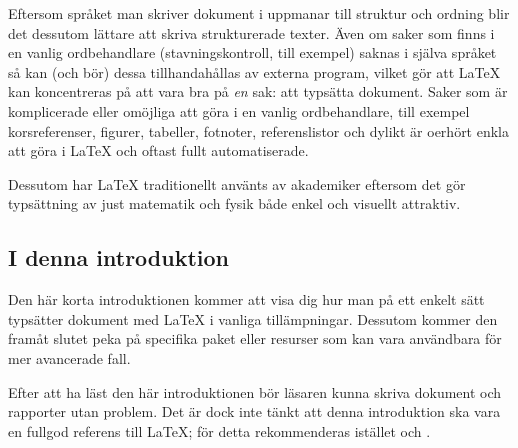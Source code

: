 \documentclass[draft,swe,10pt,nofont]{skrapport}
\makeatletter
\let\@oldLaTeX\LaTeX
\def\LaTeX{\texorpdfstring{\@oldLaTeX}{LaTeX}}
\makeatother
\begin{document}
	Eftersom språket man skriver dokument i uppmanar till struktur och ordning
	blir det dessutom lättare att skriva strukturerade texter. Även om saker
	som finns i en vanlig ordbehandlare (stavningskontroll, till exempel) saknas i
	själva språket så kan (och bör) dessa tillhandahållas av externa program,
	vilket gör att \LaTeX{} kan koncentreras på att vara bra på \emph{en} sak:
	att typsätta dokument. Saker som är komplicerade eller omöjliga att göra
	i en vanlig ordbehandlare, till exempel korsreferenser, figurer, tabeller,
	fotnoter, referenslistor och dylikt är oerhört enkla att göra i \LaTeX{}
	och oftast fullt automatiserade.
	
	Dessutom har \LaTeX{} traditionellt använts av akademiker eftersom det gör 
	typsättning av just matematik och fysik både enkel och visuellt attraktiv. 
	
	\subsection*{I denna introduktion}
	Den här korta introduktionen kommer att visa dig hur man på ett enkelt
	sätt typsätter dokument med \LaTeX{} i vanliga tillämpningar.
	Dessutom kommer den framåt slutet peka på specifika paket eller
	resurser som kan vara användbara för mer avancerade fall.
	
	Efter att ha läst den här introduktionen bör läsaren kunna skriva
	dokument och rapporter utan problem. Det är dock inte tänkt att denna
	introduktion ska vara en fullgod referens till \LaTeX; för detta
	rekommenderas istället  och
	.
	
\end{document}
